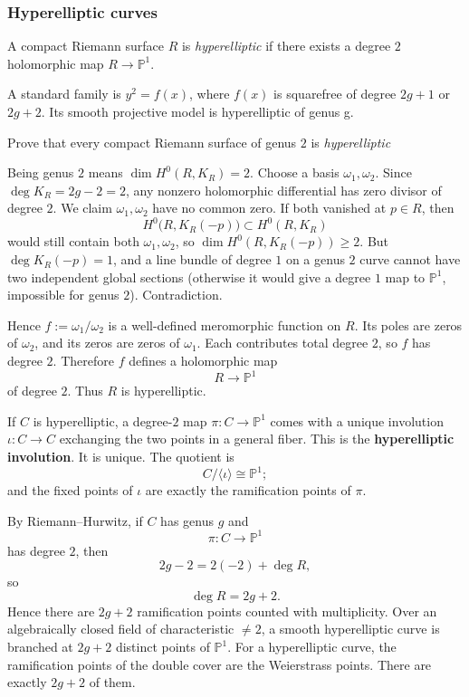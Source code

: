 \documentclass[12pt]{article}
\begin{document}
\subsubsection{Hyperelliptic curves}

\begin{definition}
    A compact Riemann surface $R$ is \textit{hyperelliptic} if there exists a degree $2$ holomorphic map $R \to \mathbb{P}^1$.
\end{definition}

A standard family is
$y^2 = f(x)$,
where $f(x)$ is squarefree of degree $2g+1$ or $2g+2$. Its smooth projective model is hyperelliptic of genus g.

\begin{exercise}
    Prove that every compact Riemann surface of genus $2$ is \textit{hyperelliptic}
\end{exercise}
\begin{solution}
    Being genus $2$ means $\dim H^0(R,K_R)=2$. Choose a basis $\omega_1,\omega_2$.
    Since $\deg K_R=2g-2=2$, any nonzero holomorphic differential has zero divisor of degree $2$. We claim $\omega_1,\omega_2$ have no common zero. If both vanished at $p\in R$, then
    \[
        H^0\big(R,K_R(-p)\big)\subset H^0(R,K_R)
    \]
    would still contain both $\omega_1,\omega_2$, so $\dim H^0(R,K_R(-p))\ge 2$. But $\deg K_R(-p)=1$, and a line bundle of degree $1$ on a genus $2$ curve cannot have two independent global sections (otherwise it would give a degree $1$ map to $\mathbb P^1$, impossible for genus $2$). Contradiction.

    Hence $f:=\omega_1/\omega_2$ is a well-defined meromorphic function on $R$. Its poles are zeros of $\omega_2$, and its zeros are zeros of $\omega_1$. Each contributes total degree $2$, so $f$ has degree $2$. Therefore $f$ defines a holomorphic map
    \[
        R\to \mathbb P^1
    \]
    of degree $2$. Thus $R$ is hyperelliptic.
\end{solution}

If $C$ is hyperelliptic, a degree-$2$ map $\pi : C \to \mathbb P^1$
comes with a unique involution $\iota : C \to C$
exchanging the two points in a general fiber. This is the \textbf{hyperelliptic involution}. It is unique. The quotient is
\[
    C/\langle \iota\rangle \cong \mathbb P^1;
\]
and the fixed points of $\iota$ are exactly the ramification points of $\pi$.


By Riemann--Hurwitz, if $C$ has genus $g$ and
\[
    \pi : C \to \mathbb P^1
\]
has degree $2$, then
\[
    2g-2 = 2(-2) + \deg R,
\]
so
\[
    \deg R = 2g+2.
\]
Hence there are $2g+2$ ramification points counted with multiplicity. Over an algebraically closed field of characteristic $\neq 2$, a smooth hyperelliptic curve is branched at $2g+2$ distinct points of $\mathbb P^1$. For a hyperelliptic curve, the ramification points of the double cover are the Weierstrass points. There are exactly $2g+2$ of them.
\end{document}
